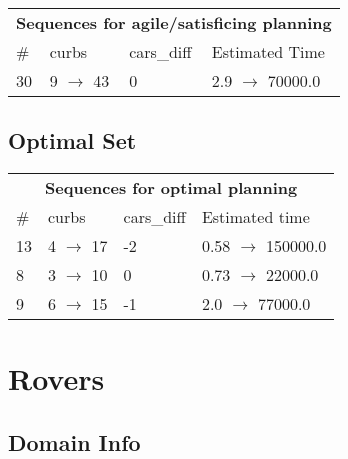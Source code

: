 \documentclass{article}
\begin{document}
                        \begin{center}
                        \begin{tabular}{l|l|l|l}
                        \multicolumn{4}{c}{\bf \large Sequences for agile/satisficing planning}\\
                        \# & curbs & cars\_diff & Estimated Time\\\midrule
                        30&9 $\rightarrow$ 43&0&2.9 $\rightarrow$ 70000.0
                        \end{tabular}
                        \end{center}
                    
                            \subsection*{Optimal Set}

                            \begin{center}
                            \begin{tabular}{l|l|l|l}
                            \multicolumn{4}{c}{\bf \large Sequences for optimal planning}\\
                            \# & curbs & cars\_diff & Estimated time\\\midrule
                            13&4 $\rightarrow$ 17&-2&0.58 $\rightarrow$ 150000.0\\
8&3 $\rightarrow$ 10&0&0.73 $\rightarrow$ 22000.0\\
9&6 $\rightarrow$ 15&-1&2.0 $\rightarrow$ 77000.0
                            \end{tabular}
                            \end{center}
                    \newpage \section{Rovers}
                    \subsection*{Domain Info}
\end{document}
